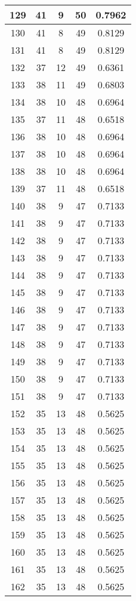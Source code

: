 \documentclass[letterpaper, 12pt]{article}
\begin{document}
\begin{longtable}{|c|c|c|c|c|}
\hline
129 & 41 & 9 & 50 & 0.7962 \\
\hline
130 & 41 & 8 & 49 & 0.8129 \\
\hline
131 & 41 & 8 & 49 & 0.8129 \\
\hline
132 & 37 & 12 & 49 & 0.6361 \\
\hline
133 & 38 & 11 & 49 & 0.6803 \\
\hline
134 & 38 & 10 & 48 & 0.6964 \\
\hline
135 & 37 & 11 & 48 & 0.6518 \\
\hline
136 & 38 & 10 & 48 & 0.6964 \\
\hline
137 & 38 & 10 & 48 & 0.6964 \\
\hline
138 & 38 & 10 & 48 & 0.6964 \\
\hline
139 & 37 & 11 & 48 & 0.6518 \\
\hline
140 & 38 & 9 & 47 & 0.7133 \\
\hline
141 & 38 & 9 & 47 & 0.7133 \\
\hline
142 & 38 & 9 & 47 & 0.7133 \\
\hline
143 & 38 & 9 & 47 & 0.7133 \\
\hline
144 & 38 & 9 & 47 & 0.7133 \\
\hline
145 & 38 & 9 & 47 & 0.7133 \\
\hline
146 & 38 & 9 & 47 & 0.7133 \\
\hline
147 & 38 & 9 & 47 & 0.7133 \\
\hline
148 & 38 & 9 & 47 & 0.7133 \\
\hline
149 & 38 & 9 & 47 & 0.7133 \\
\hline
150 & 38 & 9 & 47 & 0.7133 \\
\hline
151 & 38 & 9 & 47 & 0.7133 \\
\hline
152 & 35 & 13 & 48 & 0.5625 \\
\hline
153 & 35 & 13 & 48 & 0.5625 \\
\hline
154 & 35 & 13 & 48 & 0.5625 \\
\hline
155 & 35 & 13 & 48 & 0.5625 \\
\hline
156 & 35 & 13 & 48 & 0.5625 \\
\hline
157 & 35 & 13 & 48 & 0.5625 \\
\hline
158 & 35 & 13 & 48 & 0.5625 \\
\hline
159 & 35 & 13 & 48 & 0.5625 \\
\hline
160 & 35 & 13 & 48 & 0.5625 \\
\hline
161 & 35 & 13 & 48 & 0.5625 \\
\hline
162 & 35 & 13 & 48 & 0.5625 \\

\end{longtable}
\end{document}
